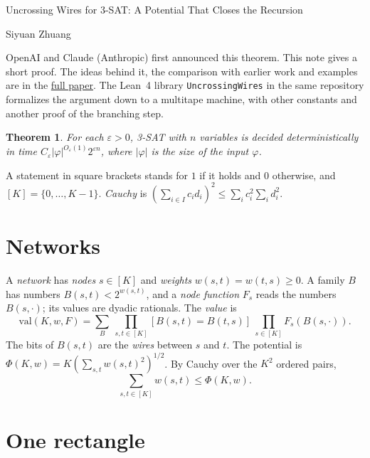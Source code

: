 \documentclass[10pt]{article}
\newtheorem{theorem}{Theorem}
\newcommand{\val}{\mathrm{val}}
\begin{document}
\begin{center}
{\Large Uncrossing Wires for 3-SAT: A Potential That Closes the Recursion}\par{}\par\smallskip
Siyuan Zhuang\par\smallskip
\small OpenAI and Claude (Anthropic) first announced this theorem. This note gives a short proof. The ideas behind it, the comparison with earlier work and examples are in the \href{https://github.com/suquark/NotETHSimplified/blob/main/papers/uncrossing-wires/paper.pdf}{full paper}. The Lean~4 library \texttt{UncrossingWires} in the same repository formalizes the argument down to a multitape machine, with other constants and another proof of the branching step.
\end{center}

\begin{theorem}
For each $\varepsilon>0$, 3-SAT with $n$ variables is decided deterministically in time $C_\varepsilon|\varphi|^{O_\varepsilon(1)}2^{\varepsilon n}$, where $|\varphi|$ is the size of the input $\varphi$.
\end{theorem}

\noindent A statement in square brackets stands for $1$ if it holds and $0$ otherwise, and $[K]=\{0,\dots,K-1\}$. \emph{Cauchy} is $(\sum_{i\in I}c_id_i)^2\le\sum_ic_i^2\sum_id_i^2$.

\section{Networks}

A \emph{network} has \emph{nodes} $s\in[K]$ and \emph{weights} $w(s,t)=w(t,s)\ge0$. A family $B$ has numbers $B(s,t)<2^{w(s,t)}$, and a \emph{node function} $F_s$ reads the numbers $B(s,\cdot)$; its values are dyadic rationals. The \emph{value} is
\[
\val(K,w,F)=\sum_{B}\ \prod_{s,t\in[K]}[B(s,t)=B(t,s)]\ \prod_{s\in[K]}F_s(B(s,\cdot)).
\]
The bits of $B(s,t)$ are the \emph{wires} between $s$ and $t$. The potential is $\Phi(K,w)=K(\sum_{s,t}w(s,t)^2)^{1/2}$. By Cauchy over the $K^2$ ordered pairs,
\begin{equation}\label{ends}
\sum_{s,t\in[K]}w(s,t)\le\Phi(K,w).
\end{equation}

\section{One rectangle}
\end{document}

